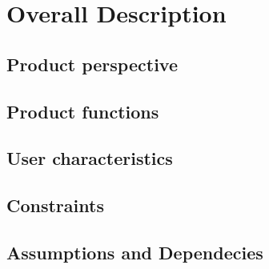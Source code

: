 \chapter{Overall Description}
\section{Product perspective}
\section{Product functions}
\section{User characteristics}
\section{Constraints}
\section{Assumptions and Dependecies}
